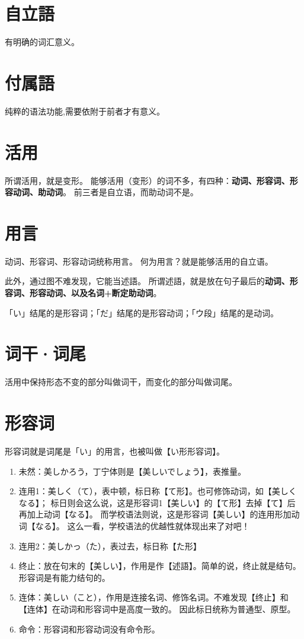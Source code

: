 \section{自立語}

有明确的词汇意义。

\section{付属語}

纯粹的语法功能,需要依附于前者才有意义。

\section{活用}

所谓活用，就是变形。
能够活用（变形）的词不多，有四种：\textbf{动词、形容词、形容动词、助动词}。
前三者是自立语，而助动词不是。

\section{用言}

动词、形容词、形容动词统称用言。
何为用言？就是能够活用的自立语。

此外，通过图不难发现，它能当述語。
所谓述語，就是放在句子最后的\textbf{动词、形容词、形容动词、以及名词+断定助动词}。

「い」结尾的是形容词；「だ」结尾的是形容动词；「ウ段」结尾的是动词。

\section{词干·词尾}

活用中保持形态不变的部分叫做词干，而变化的部分叫做词尾。

\section{形容词}

形容词就是词尾是「い」的用言，也被叫做【い形形容词】。

\begin{enumerate}
    \item 未然：美しかろう，丁宁体则是【美しいでしょう】，表推量。
    \item 连用1：美しく（て），表中顿，标日称【て形】。也可修饰动词，如【美しくなる】；
          标日则会这么说，这是形容词1【美しい】的【て形】去掉【て】后再加上动词【なる】。
          而学校语法则说，这是形容词【美しい】的连用形加动词【なる】。
          这么一看，学校语法的优越性就体现出来了对吧！
    \item 连用2：美しかっ（た），表过去，标日称【た形】
    \item 终止：放在句末的【美しい】，作用是作【述語】。简单的说，终止就是结句。形容词是有能力结句的。
    \item 连体：美しい（こと），作用是连接名词、修饰名词。不难发现【终止】和【连体】在动词和形容词中是高度一致的。
          因此标日统称为普通型、原型。
    \item 命令：形容词和形容动词没有命令形。
\end{enumerate}



